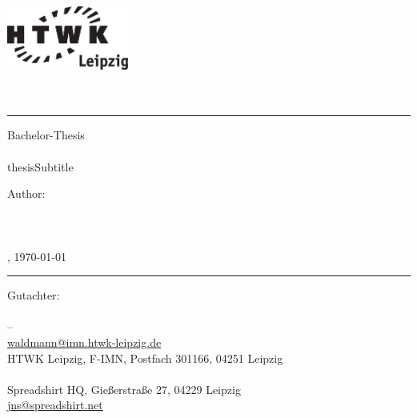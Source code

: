 
\begin{center}
    \includegraphics[width=4cm]{frontpage/HTWK_Logo_schwarz}\\
    \vspace{12pt}
    \large
        \textbf{\thesisUniversity}\\
    \vspace{6pt}
    \normalsize
        \thesisUniversityDepartment\\

    \vspace{24pt}
    \rule{\textwidth}{0.5pt}
    \vspace{12pt}

    \Huge
        Bachelor-Thesis\\
    \vspace{12pt}
    \Large
        \textbf{\thesisTitle}\\
        \ifcsname thesisSubtitle \endcsname
            \large
            \thesisSubtitle
        \else
        \fi
    \vspace{24pt}

    \small
        Author:\\
    \vspace{6pt}
    \large
        \textbf{\thesisAuthor}\\
        \vspace{3pt}
        \normalsize
        \thesisAuthorClass\\
        \thesisAuthorEmail\\
        \thesisAuthorCity, \today\\        

    \vspace{24pt}
    \rule{\textwidth}{0.5pt}
    \vspace{12pt}

    \vfill
    \small
        Gutachter:\\
    \vspace{6pt}
    \large
        \thesisAdvisor\\
    \small
        \thesisUniversity{} -- \thesisUniversityDepartment\\
        \href{mailto:waldmann@imn.htwk-leipzig.de}{waldmann@imn.htwk-leipzig.de}\\
        HTWK Leipzig, F-IMN, Postfach 301166, 04251 Leipzig\\

    \vspace{6pt}
    \large
        \thesisAdvisorSprd\\
    \small
        Spreadshirt HQ, Gießerstraße 27, 04229 Leipzig\\
        \href{mailto:jns@spreadshirt.net}{jns@spreadshirt.net}\\
\end{center}
